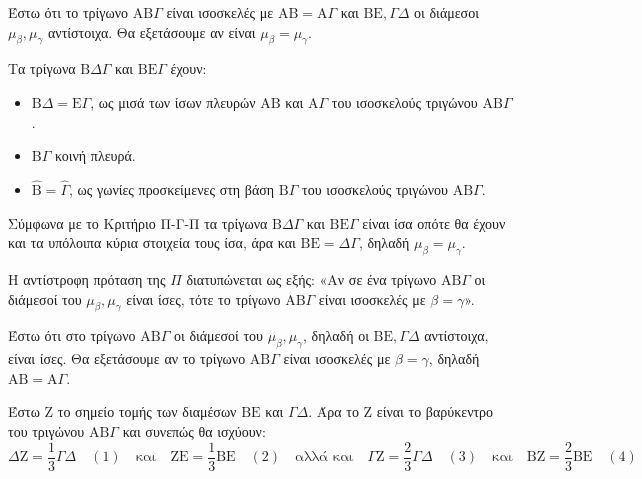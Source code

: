 \begin{alist}
    \item Έστω ότι το τρίγωνο $\mathrm{A}\mathrm{B}\Gamma$ είναι ισοσκελές με $\mathrm{A}\mathrm{B} = \mathrm{A}\Gamma$ και $\mathrm{B}\mathrm{E}, \Gamma\Delta$ οι διάμεσοι $\mu_\beta, \mu_\gamma$ αντίστοιχα. Θα εξετάσουμε αν είναι $\mu_\beta = \mu_\gamma$.
    
    
    Τα τρίγωνα $\mathrm{B}\Delta\Gamma$ και $\mathrm{B}\mathrm{E}\Gamma$ έχουν:
    \begin{itemize}
        \item $\mathrm{B}\Delta = \mathrm{E}\Gamma$, ως μισά των ίσων πλευρών $\mathrm{A}\mathrm{B}$ και $\mathrm{A}\Gamma$ του ισοσκελούς τριγώνου $\mathrm{A}\mathrm{B}\Gamma$.
        \item $\mathrm{B}\Gamma$ κοινή πλευρά.
        \item $\hat{\mathrm{B}} = \hat{\Gamma}$, ως γωνίες προσκείμενες στη βάση $\mathrm{B}\Gamma$ του ισοσκελούς τριγώνου $\mathrm{A}\mathrm{B}\Gamma$.
    \end{itemize}
    Σύμφωνα με το Κριτήριο Π-Γ-Π τα τρίγωνα $\mathrm{B}\Delta\Gamma$ και $\mathrm{B}\mathrm{E}\Gamma$ είναι ίσα οπότε θα έχουν και τα υπόλοιπα κύρια στοιχεία τους ίσα, άρα και $\mathrm{B}\mathrm{E} = \Delta\Gamma$, δηλαδή $\mu_\beta = \mu_\gamma$.
    
    \item Η αντίστροφη πρόταση της $\Pi$ διατυπώνεται ως εξής:
    «Αν σε ένα τρίγωνο $\mathrm{A}\mathrm{B}\Gamma$ οι διάμεσοί του $\mu_\beta, \mu_\gamma$ είναι ίσες, τότε το τρίγωνο $\mathrm{A}\mathrm{B}\Gamma$ είναι ισοσκελές με $\beta = \gamma$».
    
    Έστω ότι στο τρίγωνο $\mathrm{A}\mathrm{B}\Gamma$ οι διάμεσοί του $\mu_\beta, \mu_\gamma$, δηλαδή οι $\mathrm{B}\mathrm{E}, \Gamma\Delta$ αντίστοιχα, είναι ίσες. Θα εξετάσουμε αν το τρίγωνο $\mathrm{A}\mathrm{B}\Gamma$ είναι ισοσκελές με $\beta = \gamma$, δηλαδή $\mathrm{A}\mathrm{B} = \mathrm{A}\Gamma$.
    
    
    Έστω $\mathrm{Z}$ το σημείο τομής των διαμέσων $\mathrm{B}\mathrm{E}$ και $\Gamma\Delta$. Άρα το $\mathrm{Z}$ είναι το βαρύκεντρο του τριγώνου $\mathrm{A}\mathrm{B}\Gamma$ και συνεπώς θα ισχύουν:
    \[ \Delta\mathrm{Z} = \frac{1}{3}\Gamma\Delta \quad (1) \quad \text{και} \quad \mathrm{Z}\mathrm{E} = \frac{1}{3}\mathrm{B}\mathrm{E} \quad (2) \quad \text{αλλά και} \quad \Gamma\mathrm{Z} = \frac{2}{3}\Gamma\Delta \quad (3) \quad \text{και} \quad \mathrm{B}\mathrm{Z} = \frac{2}{3}\mathrm{B}\mathrm{E} \quad (4) \]
    

\end{alist}

